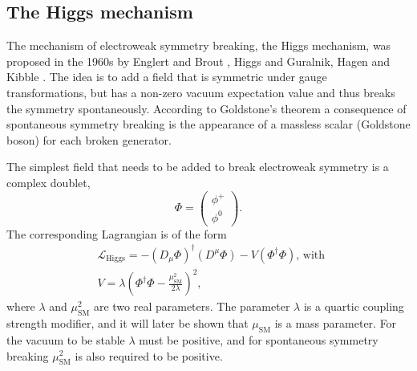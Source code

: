 \subsection{The Higgs mechanism}
\label{sec:theory_sm_higgsmech}
The mechanism of electroweak symmetry breaking, the
Higgs mechanism, was proposed in the 1960s by Englert and Brout \cite{englertbrout},
Higgs \cite{higgs-I,higgs-II,higgs-III} and Guralnik, Hagen and Kibble \cite{GHK}.
The idea is to add a field that is symmetric under gauge transformations, but
has a non-zero vacuum expectation value and thus breaks the symmetry spontaneously.
According to Goldstone's theorem \cite{goldstone-theorem,goldstone-theorem-2} a 
consequence of spontaneous symmetry breaking is the appearance of a 
massless scalar (Goldstone boson) for each broken generator.

The simplest field that needs to be added to break electroweak symmetry is a complex doublet,
\begin{equation}\label{eqn:phi_hfield}
\Phi = \begin{pmatrix} \phi^{+} \\
\phi^{0} \end{pmatrix}.
\end{equation}
The corresponding Lagrangian is of the form
\begin{equation}\label{eqn:higgs_gen_lag}
\begin{split}
&\mathcal{L}_{\text{Higgs}} = -(D_{\mu}\Phi)^{\dagger}(D^{\mu}\Phi) - V(\Phi^{\dagger}\Phi) \text{, with }\\
&V = \lambda(\Phi^{\dagger}\Phi - \frac{\mu_{\text{SM}}^2}{2\lambda})^2,
\end{split}
\end{equation}
where $\lambda$ and $\mu_{\text{SM}}^2$ are two real parameters. The parameter $\lambda$ 
is a quartic coupling strength modifier, and it will later be shown 
that $\mu_{\text{SM}}$ is a mass parameter.
For the vacuum to be stable $\lambda$ must be positive,
and for spontaneous symmetry breaking $\mu_{\text{SM}}^2$ is also required to be positive.

